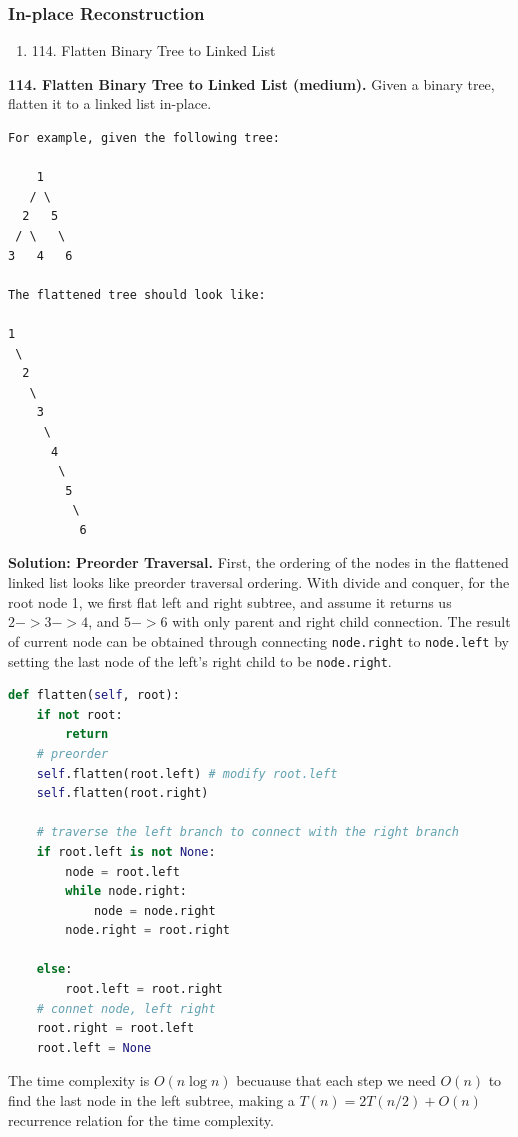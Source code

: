 \documentclass[../main.tex]{subfiles}
\begin{document}
\subsubsection{In-place Reconstruction}
\begin{enumerate}
    \item 114. Flatten Binary Tree to Linked List
\end{enumerate}
\begin{examples}[resume]
\item \textbf{114. Flatten Binary Tree to Linked List (medium).} Given a binary tree, flatten it to a linked list in-place.
\begin{lstlisting}[numbers=none]
For example, given the following tree:

    1
   / \
  2   5
 / \   \
3   4   6

The flattened tree should look like:

1
 \
  2
   \
    3
     \
      4
       \
        5
         \
          6
\end{lstlisting}
\textbf{Solution: Preorder Traversal.} First, the ordering of the nodes in the flattened linked list looks like preorder traversal ordering. With divide and conquer, for the root node 1, we first flat left and right subtree, and assume it returns us $2->3->4$, and $5->6$ with only parent and right child connection. The result of current node can be obtained through connecting \texttt{node.right} to \texttt{node.left} by setting the last node of the left's right child to be \texttt{node.right}. 
\begin{lstlisting}[language=Python]
def flatten(self, root):
    if not root:
        return 
    # preorder
    self.flatten(root.left) # modify root.left
    self.flatten(root.right)

    # traverse the left branch to connect with the right branch
    if root.left is not None:
        node = root.left
        while node.right:
            node = node.right
        node.right = root.right

    else:
        root.left = root.right
    # connet node, left right
    root.right = root.left
    root.left = None
\end{lstlisting}
The time complexity is $O(n\log n)$ becuause that each step we need $O(n)$ to find the last node in the left subtree, making a $T(n) = 2T(n/2)+O(n)$ recurrence relation for the time complexity.


\end{examples}
\end{document}
